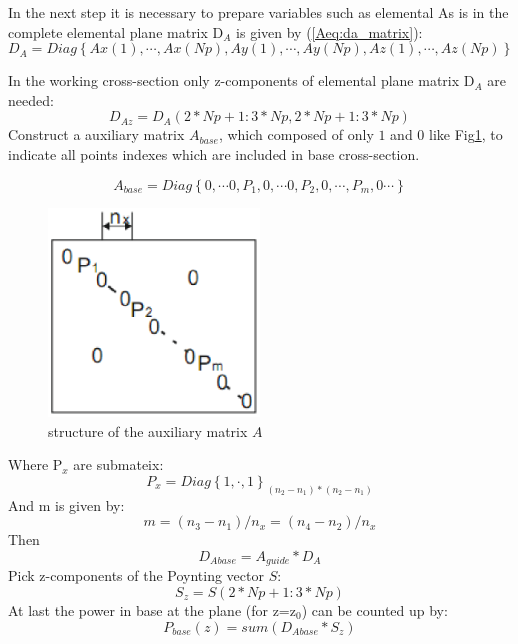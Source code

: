 In the next step it is necessary to prepare variables such as elemental 
As is in \cite{script_FeldSim} the complete elemental plane matrix D$_{A}$ is given by (\ref{Aeq:da_matrix}): 
\begin{equation}
D_{A}=Diag\left\{Ax(1),\cdots,Ax(Np),Ay(1),\cdots,Ay(Np), Az(1),\cdots,Az(Np)\right\}
\label{Aeq:da_matrix}
\end{equation}

In the working cross-section only z-components of elemental plane matrix D$_{A}$ are needed:
\begin{equation}
D_{Az}=D_{A}(2*Np+1:3*Np, 2*Np+1:3*Np)
\label{Aeq:daz_matrix}
\end{equation}
Construct a auxiliary matrix $A_{base}$, which composed of only $1$ and $0$ like Fig\quad\ref{Afig:app_Auxiliary_matrix}, to indicate all points indexes which are included in base cross-section. 

\begin{equation}
A_{base}=Diag\left\{0,\cdots 0,P_{1},0,\cdots 0, P_{2}, 0,\cdots, P_{m}, 0\cdots\right\}
\label{Aeq:A_matrix}
\end{equation}

\begin{figure}[!ht]
\centering
\includegraphics[width=0.5\textwidth]{bilder/app_Auxiliary_matrix}
\caption{structure of the auxiliary matrix $A$}
\label{Afig:app_Auxiliary_matrix}
\end{figure}
Where P$_{x}$ are submateix:
\begin{equation}
P_{x}=Diag\left\{1,\cdot,1\right\}_{(n_{2}-n_{1})*(n_{2}-n_{1})}
\end{equation}
And m is given by:
\begin{equation}
m=(n_{3}-n_{1})/n_{x}=(n_{4}-n_{2})/n_{x}
\end{equation}
Then 
\begin{equation}
D_{Abase}=A_{guide}*D_{A}
\end{equation}
Pick z-components of the Poynting vector $S$:
\begin{equation}
S_{z}=S(2*Np+1:3*Np)
\end{equation}
At last the power in base at the plane (for z=z$_{0}$) can be counted up by:
\begin{equation}
P_{base}(z)=sum(D_{Abase}*S_{z})
\end{equation}

